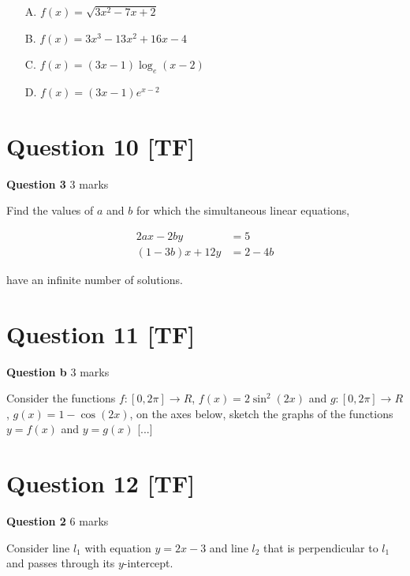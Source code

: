 \documentclass[10pt,a4paper]{article}
\begin{document}
\begin{enumerate}
    \item[A.] $f(x) = \sqrt{3x^2 - 7x + 2}$
    \item[B.] $f(x) = 3x^3 - 13x^2 + 16x - 4$
    \item[C.] $f(x) = (3x - 1)\log_e(x - 2)$
    \item[D.] $f(x) = (3x - 1)e^{x-2}$
\end{enumerate}

\vspace{9\baselineskip}

\hrulefill

\section*{Question 10 [TF]}

\textbf{Question 3} \hfill 3 marks

Find the values of $a$ and $b$ for which the simultaneous linear equations,

\begin{align*}
2ax - 2by &= 5\\
(1-3b)x + 12y &= 2 - 4b
\end{align*}

have an infinite number of solutions.

\vspace{9\baselineskip}

\hrulefill

\section*{Question 11 [TF]}

\textbf{Question b} \hfill 3 marks

Consider the functions $f : [0,2\pi] \to R$, $f(x) = 2\sin^2(2x)$ and $g : [0,2\pi] \to R$, $g(x) = 1 - \cos(2x)$, on the axes below, sketch the graphs of the functions $y = f(x)$ and $y = g(x)$ [...]

\vspace{9\baselineskip}

\hrulefill

\section*{Question 12 [TF]}

\textbf{Question 2} \hfill 6 marks

Consider line $l_1$ with equation $y = 2x - 3$ and line $l_2$ that is perpendicular to $l_1$ and passes through its $y$-intercept.
\end{document}
